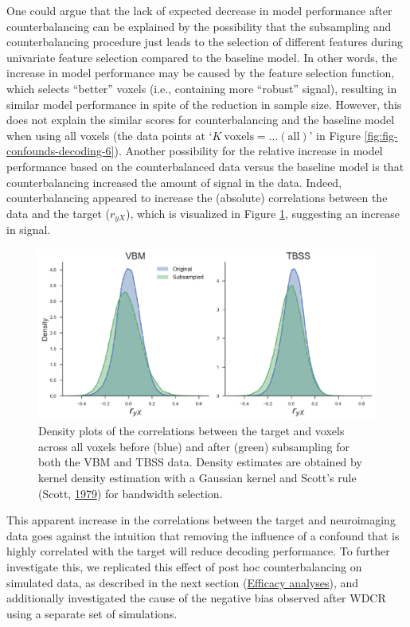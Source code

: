 \documentclass[12pt,american,a4paper,oneside,]{memoir} %
\begin{document}
One could argue that the lack of expected decrease in model performance after counterbalancing can be explained by the possibility that the subsampling and counterbalancing procedure just leads to the selection of different features during univariate feature selection compared to the baseline model. In other words, the increase in model performance may be caused by the feature selection function, which selects ``better'' voxels (i.e., containing more ``robust'' signal), resulting in similar model performance in spite of the reduction in sample size. However, this does not explain the similar scores for counterbalancing and the baseline model when using all voxels (the data points at `\(K\ \mathrm{voxels} = \dots \mathrm{(all)}\)' in Figure \ref{fig:fig-confounds-decoding-6}). Another possibility for the relative increase in model performance based on the counterbalanced data versus the baseline model is that counterbalancing increased the amount of signal in the data. Indeed, counterbalancing appeared to increase the (absolute) correlations between the data and the target (\(r_{yX}\)), which is visualized in Figure \ref{fig:fig-confounds-decoding-7}, suggesting an increase in signal.

\begin{figure}
\centering
\includegraphics{_bookdown_files/confounds-decoding-files/figures/figure_7.pdf}
\caption{\label{fig:fig-confounds-decoding-7}Density plots of the correlations between the target and voxels across all voxels before (blue) and after (green) subsampling for both the VBM and TBSS data. Density estimates are obtained by kernel density estimation with a Gaussian kernel and Scott's rule (Scott, \protect\hyperlink{ref-scott1979optimal}{1979}) for bandwidth selection.}
\end{figure}



This apparent increase in the correlations between the target and neuroimaging data goes against the intuition that removing the influence of a confound that is highly correlated with the target will reduce decoding performance. To further investigate this, we replicated this effect of post hoc counterbalancing on simulated data, as described in the next section (\protect\hyperlink{confounds-decoding-results-cb-efficacy}{Efficacy analyses}), and additionally investigated the cause of the negative bias observed after WDCR using a separate set of simulations.
\end{document}
